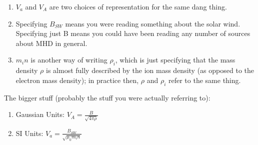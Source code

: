 \begin{center}
  \begin{enumerate}
    \item $V_{a}$ and $V_{A}$ are two choices of representation for the same dang
      thing.
    \item Specifying $B_{SW}$ means you were reading something about the solar
      wind. Specifying just B means you could have been reading any number of
      sources about MHD in general.
    \item $m_{i}n$ is another way of writing $\rho_{i}$, which is just
      specifying that the mass density $\rho$ is almost fully described by the
      ion mass density (as opposed to the electron mass density); in practice
      then, $\rho$ and $\rho_{i}$ refer to the same thing.
  \end{enumerate}
\end{center}

The bigger stuff (probably the stuff you were actually referring to):

\begin{center}
  \begin{enumerate}
    \item Gaussian Units: $V_{A}=\frac{B}{\sqrt{4\pi\rho}}$
    \item SI Units: $V_{a}=\frac{B_{SW}}{\sqrt{\mu_{0}m_{i}n}}$
  \end{enumerate}
\end{center}
